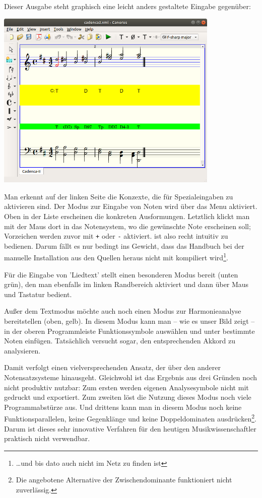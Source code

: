 Dieser Ausgabe steht graphisch eine leicht anders gestaltete Eingabe gegenüber:

\begin{center}
\includegraphics[width=0.8\textwidth]{frontends/canorus/cadenca2-canorus}
\end{center}

Man erkennt auf der linken Seite die Konzexte, die für Spezialeingaben zu
aktivieren sind. Der Modus zur Eingabe von Noten wird über das Menu aktiviert.
Oben in der Liste erscheinen die konkreten Ausformungen. Letztlich klickt man
mit der Maus dort in das Notensystem, wo die gewünschte Note erscheinen soll;
Vorzeichen werden zuvor mit \texttt{+} oder \texttt{-} aktiviert. 
ist also recht intuitiv zu bedienen. Darum fällt es nur bedingt ins Gewicht, dass
das Handbuch bei der manuelle Installation aus den Quellen heraus nicht mit
kompiliert wird\footnote{\ldots und bis dato auch nicht im Netz zu finden ist}.

Für die Eingabe von 'Liedtext' stellt  einen besonderen Modus
bereit (unten grün), den man ebenfalls im linken Randbereich aktiviert und dann
über Maus und Tastatur bedient.

Außer dem Textmodus möchte  auch noch einen Modus zur
Harmonieanalyse bereitstellen (oben, gelb). In diesem Modus kann man -- wie es
unser Bild zeigt -- in der oberen Programmleiste Funktionssymbole auswählen und
unter bestimmte Noten einfügen. Tatsächlich versucht  sogar, den
entsprechenden Akkord zu analysieren.

Damit verfolgt  einen vielversprechenden Ansatz, der über den
anderer Notensatzsysteme hinausgeht. Gleichwohl ist das Ergebnis aus drei
Gründen noch nicht produktiv nutzbar: Zum ersten werden  eigenen
Analysesymbole nicht mit gedruckt und exportiert. Zum zweiten löst die Nutzung
dieses Modus noch viele Programmabstürze aus. Und drittens kann man in diesem
Modus noch keine Funktionsparallelen, keine Gegenklänge und keine
Doppeldominaten ausdrücken\footnote{Die angebotene Alternative der
Zwischendominante funktioniert nicht zuverlässig.}. Darum ist dieses sehr
innovative Verfahren für den heutigen Musikwissenschaftler praktisch nicht
verwendbar.

